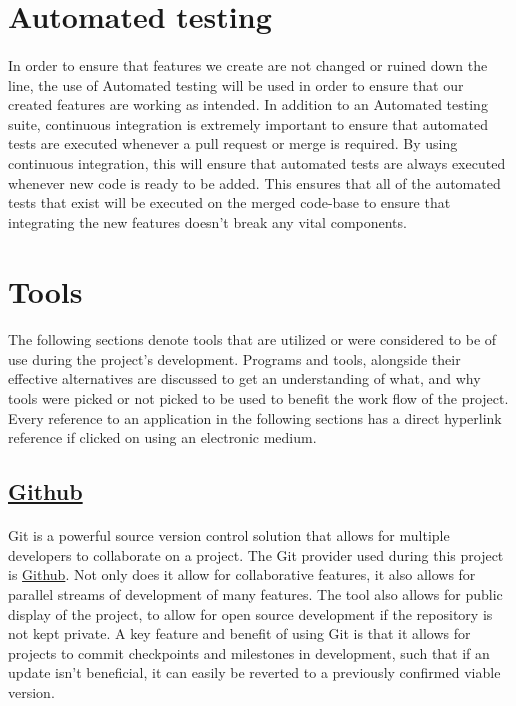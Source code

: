 \documentclass[12pt]{article}
\begin{document}
\newpage

\section{Automated testing}
\paragraph{}
	In order to ensure that features we create are not changed or ruined down the line, the use of Automated testing will be used in order to ensure that our created features are working as intended. In addition to an Automated testing suite, continuous integration is extremely important to ensure that automated tests are executed whenever a pull request or merge is required. By using continuous integration, this will ensure that automated tests are always executed whenever new code is ready to be added. This ensures that all of the automated tests that exist will be executed on the merged code-base to ensure that integrating the new features doesn't break any vital components.



\newpage

\section{Tools}
\paragraph{}	The following sections denote tools that are utilized or were considered to be of use during the project's development. Programs and tools, alongside their effective alternatives are discussed to get an understanding of what, and why tools were picked or not picked to be used to benefit the work flow of the project. Every reference to an application in the following sections has a direct hyperlink reference if clicked on using an electronic medium.

\subsection{\href{https://Github.com}{Github}}
\paragraph{}	Git is a powerful source version control solution that allows for multiple developers to collaborate on  a project. The Git provider used during this project is \href{https://Github.com}{Github}. Not only does it allow for collaborative features, it also allows for parallel streams of development of many features. The tool also allows for public display of the project, to allow for open source development if the repository is not kept private. A key feature and benefit of using Git is that it allows for projects to commit checkpoints and milestones in development, such that if an update isn't beneficial, it can easily be reverted to a previously confirmed viable version.
\end{document}
